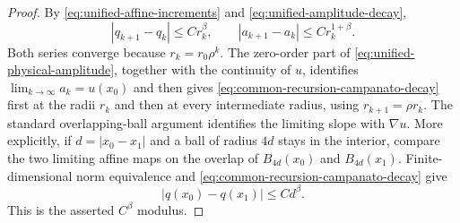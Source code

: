 \documentclass[11pt,reqno]{amsart}
\numberwithin{equation}{section}
\theoremstyle{remark}
\begin{document}
\begin{proof}
By \eqref{eq:unified-affine-increments} and
\eqref{eq:unified-amplitude-decay},
\[
 |q_{k+1}-q_k|\le Cr_k^{\beta},
 \qquad
 |a_{k+1}-a_k|\le Cr_k^{1+\beta}.
\]
Both series converge because \(r_k=r_0\rho^k\).  The zero-order part
of \eqref{eq:unified-physical-amplitude}, together with the continuity
of \(u\), identifies \(\lim_{k\to\infty}a_k=u(x_0)\) and then gives
\eqref{eq:common-recursion-campanato-decay} first at the radii $r_k$ and
then at every intermediate radius, using
\(r_{k+1}=\rho r_k\).  The standard overlapping-ball
argument identifies the limiting slope with $\nabla u$.  More
explicitly, if \(d=|x_0-x_1|\) and a ball of radius \(4d\) stays in the
interior, compare the two limiting affine maps on the overlap of
\(B_{4d}(x_0)\) and \(B_{4d}(x_1)\).  Finite-dimensional norm
equivalence and \eqref{eq:common-recursion-campanato-decay} give
\[
 |q(x_0)-q(x_1)|\le Cd^\beta.
\]
This is the asserted \(C^\beta\) modulus.
\end{proof}
\end{document}
